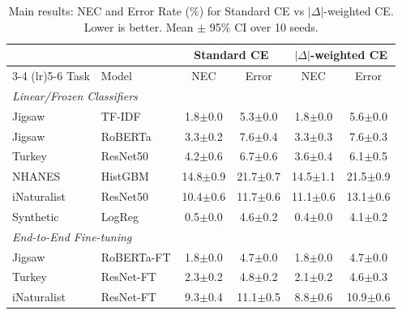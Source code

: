 \begin{table}[t]
\centering
\caption{Main results: NEC and Error Rate (\%) for Standard CE vs $|\Delta|$-weighted CE. Lower is better. Mean $\pm$ 95\% CI over 10 seeds.}
\label{tab:main-results}
\small
\begin{tabular}{llcccc}
\toprule
 & & \multicolumn{2}{c}{Standard CE} & \multicolumn{2}{c}{$|\Delta|$-weighted CE} \\
\cmidrule(lr){3-4} \cmidrule(lr){5-6}
Task & Model & NEC & Error & NEC & Error \\
\midrule
\multicolumn{6}{l}{\textit{Linear/Frozen Classifiers}} \\
Jigsaw & TF-IDF & 1.8$\pm$0.0 & 5.3$\pm$0.0 & 1.8$\pm$0.0 & 5.6$\pm$0.0 \\
Jigsaw & RoBERTa & 3.3$\pm$0.2 & 7.6$\pm$0.4 & 3.3$\pm$0.3 & 7.6$\pm$0.3 \\
Turkey & ResNet50 & 4.2$\pm$0.6 & 6.7$\pm$0.6 & 3.6$\pm$0.4 & 6.1$\pm$0.5 \\
NHANES & HistGBM & 14.8$\pm$0.9 & 21.7$\pm$0.7 & 14.5$\pm$1.1 & 21.5$\pm$0.9 \\
iNaturalist & ResNet50 & 10.4$\pm$0.6 & 11.7$\pm$0.6 & 11.1$\pm$0.6 & 13.1$\pm$0.6 \\
Synthetic & LogReg & 0.5$\pm$0.0 & 4.6$\pm$0.2 & 0.4$\pm$0.0 & 4.1$\pm$0.2 \\
\midrule
\multicolumn{6}{l}{\textit{End-to-End Fine-tuning}} \\
Jigsaw & RoBERTa-FT & 1.8$\pm$0.0 & 4.7$\pm$0.0 & 1.8$\pm$0.0 & 4.7$\pm$0.0 \\
Turkey & ResNet-FT & 2.3$\pm$0.2 & 4.8$\pm$0.2 & 2.1$\pm$0.2 & 4.6$\pm$0.3 \\
iNaturalist & ResNet-FT & 9.3$\pm$0.4 & 11.1$\pm$0.5 & 8.8$\pm$0.6 & 10.9$\pm$0.6 \\
\bottomrule
\end{tabular}
\end{table}
